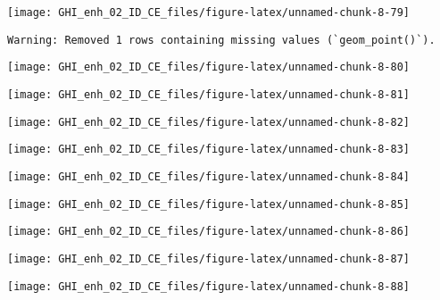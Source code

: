 \documentclass[
  10pt,
  a4paper,oneside]{article}
\begin{document}
\begin{center}\texttt{[image: GHI\_enh\_02\_ID\_CE\_files/figure-latex/unnamed-chunk-8-79]} \end{center}

\begin{verbatim}
Warning: Removed 1 rows containing missing values (`geom_point()`).
\end{verbatim}

\begin{center}\texttt{[image: GHI\_enh\_02\_ID\_CE\_files/figure-latex/unnamed-chunk-8-80]} \end{center}

\begin{center}\texttt{[image: GHI\_enh\_02\_ID\_CE\_files/figure-latex/unnamed-chunk-8-81]} \end{center}

\begin{center}\texttt{[image: GHI\_enh\_02\_ID\_CE\_files/figure-latex/unnamed-chunk-8-82]} \end{center}

\begin{center}\texttt{[image: GHI\_enh\_02\_ID\_CE\_files/figure-latex/unnamed-chunk-8-83]} \end{center}

\begin{center}\texttt{[image: GHI\_enh\_02\_ID\_CE\_files/figure-latex/unnamed-chunk-8-84]} \end{center}

\begin{center}\texttt{[image: GHI\_enh\_02\_ID\_CE\_files/figure-latex/unnamed-chunk-8-85]} \end{center}

\begin{center}\texttt{[image: GHI\_enh\_02\_ID\_CE\_files/figure-latex/unnamed-chunk-8-86]} \end{center}

\begin{center}\texttt{[image: GHI\_enh\_02\_ID\_CE\_files/figure-latex/unnamed-chunk-8-87]} \end{center}

\begin{center}\texttt{[image: GHI\_enh\_02\_ID\_CE\_files/figure-latex/unnamed-chunk-8-88]} \end{center}
\end{document}
